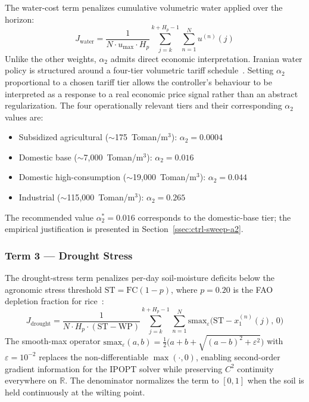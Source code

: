 The water-cost term penalizes cumulative volumetric water applied over the
horizon:
\begin{equation}
J_{\mathrm{water}} = \frac{1}{N \cdot u_{\max} \cdot H_p}
  \sum_{j=k}^{k+H_p-1} \sum_{n=1}^{N} u^{(n)}(j)
\label{eq:J-water}
\end{equation}
Unlike the other weights, $\alpha_2$ admits direct economic interpretation.
Iranian water policy is structured around a four-tier volumetric tariff
schedule~\cite{Mesgaran2018}. Setting $\alpha_2$ proportional to a chosen
tariff tier allows the controller's behaviour to be interpreted as a response
to a real economic price signal rather than an abstract regularization.
The four operationally relevant tiers and their corresponding $\alpha_2$
values are:
\begin{itemize}
  \item Subsidized agricultural ($\sim$175~Toman/m$^3$):
    $\alpha_2 = 0.0004$
  \item Domestic base ($\sim$7{,}000~Toman/m$^3$):
    $\alpha_2 = 0.016$
  \item Domestic high-consumption ($\sim$19{,}000~Toman/m$^3$):
    $\alpha_2 = 0.044$
  \item Industrial ($\sim$115{,}000~Toman/m$^3$):
    $\alpha_2 = 0.265$
\end{itemize}
The recommended value $\alpha_2^* = 0.016$ corresponds to the domestic-base
tier; the empirical justification is presented in
Section~\ref{ssec:ctrl-sweep-a2}.

\subsubsection*{Term 3 — Drought Stress}

The drought-stress term penalizes per-day soil-moisture deficits below the
agronomic stress threshold $\mathrm{ST} = \mathrm{FC}(1 - p)$, where $p = 0.20$
is the FAO depletion fraction for rice~\cite{allen1998}:
\begin{equation}
J_{\mathrm{drought}} = \frac{1}{N \cdot H_p \cdot (\mathrm{ST} - \mathrm{WP})}
  \sum_{j=k}^{k+H_p-1} \sum_{n=1}^{N}
  \mathrm{smax}_{\varepsilon}\!\bigl(\mathrm{ST} - x_1^{(n)}(j),\, 0\bigr)
\label{eq:J-drought}
\end{equation}
The smooth-max operator $\mathrm{smax}_{\varepsilon}(a,b) =
\tfrac{1}{2}\bigl(a + b + \sqrt{(a-b)^2 + \varepsilon^2}\bigr)$ with
$\varepsilon = 10^{-2}$ replaces the non-differentiable $\max(\cdot, 0)$,
enabling second-order gradient information for the IPOPT solver while
preserving $C^2$ continuity everywhere on $\mathbb{R}$. The denominator
normalizes the term to $[0,1]$ when the soil is held continuously at the
wilting point.

